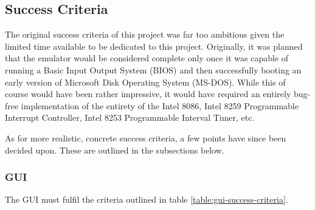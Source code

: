 \subsection{Success Criteria}
    The original success criteria of this project was far too ambitious given the limited time available to be dedicated to this project. Originally, it was planned that the emulator would be considered complete only once it was capable of running a Basic Input Output System (BIOS) and then successfully booting an early version of Microsoft Disk Operating System (MS-DOS). While this of course would have been rather impressive, it would have required an entirely bug-free implementation of the entirety of the Intel 8086, Intel 8259 Programmable Interrupt Controller, Intel 8253 Programmable Interval Timer, etc.

    As for more realistic, concrete success criteria, a few points have since been decided upon. These are outlined in the subsections below.

    \subsubsection{GUI}
        The GUI must fulfil the criteria outlined in table \ref{table:gui-success-criteria}.

